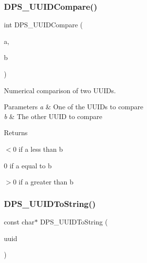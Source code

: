 \subsubsection{\texorpdfstring{D\+P\+S\+\_\+\+U\+U\+I\+D\+Compare()}{DPS\_UUIDCompare()}}
{\footnotesize\ttfamily int D\+P\+S\+\_\+\+U\+U\+I\+D\+Compare (\begin{DoxyParamCaption}\item[{const \hyperlink{group__uuid_gaef1d03afcc6410602ade1d48f24c3997}{D\+P\+S\+\_\+\+U\+U\+ID} $\ast$}]{a,  }\item[{const \hyperlink{group__uuid_gaef1d03afcc6410602ade1d48f24c3997}{D\+P\+S\+\_\+\+U\+U\+ID} $\ast$}]{b }\end{DoxyParamCaption})}



Numerical comparison of two U\+U\+I\+Ds. 


\begin{DoxyParams}{Parameters}
{\em a} & One of the U\+U\+I\+Ds to compare \\
\hline
{\em b} & The other U\+U\+ID to compare\\
\hline
\end{DoxyParams}
\begin{DoxyReturn}{Returns}

\begin{DoxyItemize}
\item $<$0 if a less than b
\item 0 if a equal to b
\item $>$0 if a greater than b 
\end{DoxyItemize}
\end{DoxyReturn}
\mbox{\label{group__uuid_ga9c51faa57ecb228ce7eda077a90b20ff}} 
\subsubsection{\texorpdfstring{D\+P\+S\+\_\+\+U\+U\+I\+D\+To\+String()}{DPS\_UUIDToString()}}
{\footnotesize\ttfamily const char$\ast$ D\+P\+S\+\_\+\+U\+U\+I\+D\+To\+String (\begin{DoxyParamCaption}\item[{const \hyperlink{group__uuid_gaef1d03afcc6410602ade1d48f24c3997}{D\+P\+S\+\_\+\+U\+U\+ID} $\ast$}]{uuid }\end{DoxyParamCaption})}



